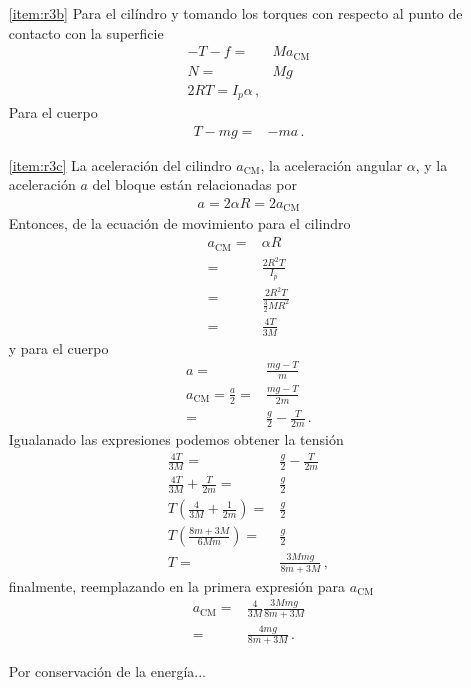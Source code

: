 \begin{enumerate}
\begin{itemize}
\item[\ref{item:r3b}] Para el cilíndro y tomando los torques con respecto al punto de contacto con la superficie
  \begin{align*}
    -T-f=&M a_{\text{CM}}\\
    N=&Mg\\
    2 R T=I_p \alpha\,,
  \end{align*}
Para el cuerpo
\begin{align*}
  T-m g=&-ma\,.
\end{align*}
\item[\ref{item:r3c}] La aceleración del cilindro $a_{\text{CM}}$, la aceleración angular $\alpha$, y la aceleración $a$ del bloque están relacionadas por
  \begin{align*}
    a=2\alpha R=2 a_{\text{CM}}
  \end{align*}
Entonces, de la ecuación de movimiento para el cilindro
\begin{align*}
  a_{\text{CM}}=&\alpha R\\
  =&\frac{2 R^2 T}{I_p}\\
  =&\frac{2 R^2 T}{\frac{3}{2}MR^2}\\
  =&\frac{4 T}{3M}\,
\end{align*}
y para el cuerpo
\begin{align*}
  a=&\frac{mg-T}{m}\\
  a_{\text{CM}}=\frac{a}{2}=&\frac{mg-T}{2m}\\
  =&\frac{g}{2}-\frac{T}{2m}\,.
\end{align*}
Igualanado las expresiones podemos obtener la tensión
\begin{align*}
\frac{4 T}{3M}=&\frac{g}{2}-\frac{T}{2m}\\
  \frac{4 T}{3M}+\frac{T}{2m}=&\frac{g}{2}\\
  T  \left(\frac{4 }{3M}+\frac{1}{2m}\right)=&\frac{g}{2}\\
  T  \left(\frac{8m+3M }{6Mm}\right)=&\frac{g}{2}\\
  T=&\frac{3Mmg}{8m+3M}\,,
\end{align*}
finalmente, reemplazando en la primera expresión para $a_{\text{CM}}$
\begin{align*}
  a_{\text{CM}}=&\frac{4}{3M}\frac{3Mmg}{8m+3M}\\
=&\frac{4mg}{8m+3M}\,.
\end{align*}


Por conservación de la energía...

\end{itemize}
\end{enumerate}

